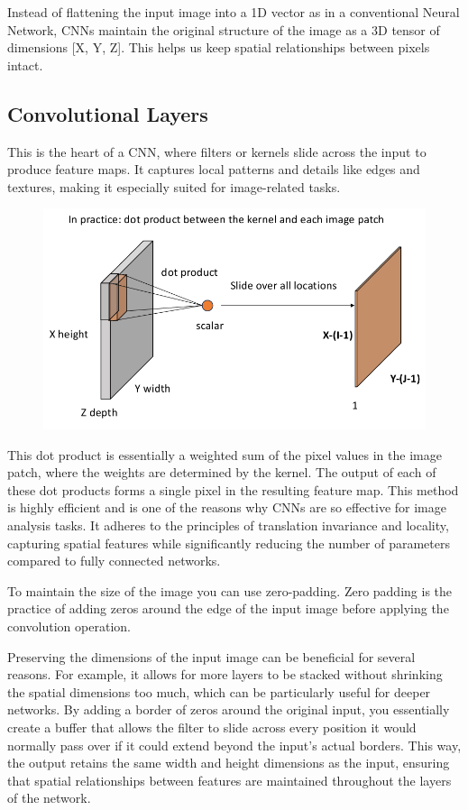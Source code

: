 \documentclass[11pt]{article}
\begin{document}
Instead of flattening the input image into a 1D vector as in a conventional Neural Network, CNNs maintain the original structure of the image as a 3D tensor of dimensions [X, Y, Z]. This helps us keep spatial relationships between pixels intact.

\subsection{Convolutional Layers}

This is the heart of a CNN, where filters or kernels slide across the input to produce feature maps. It captures local patterns and details like edges and textures, making it especially suited for image-related tasks.

\begin{figure}[H]
    \centering
    \includegraphics[width=.6\linewidth]{figures/convolution.png}
\end{figure}

This dot product is essentially a weighted sum of the pixel values in the image patch, where the weights are determined by the kernel. The output of each of these dot products forms a single pixel in the resulting feature map. This method is highly efficient and is one of the reasons why CNNs are so effective for image analysis tasks. It adheres to the principles of translation invariance and locality, capturing spatial features while significantly reducing the number of parameters compared to fully connected networks. 

To maintain the size of the image you can use zero-padding. Zero padding is the practice of adding zeros around the edge of the input image before applying the convolution operation. 

Preserving the dimensions of the input image can be beneficial for several reasons. For example, it allows for more layers to be stacked without shrinking the spatial dimensions too much, which can be particularly useful for deeper networks. By adding a border of zeros around the original input, you essentially create a buffer that allows the filter to slide across every position it would normally pass over if it could extend beyond the input's actual borders. This way, the output retains the same width and height dimensions as the input, ensuring that spatial relationships between features are maintained throughout the layers of the network.
\end{document}
